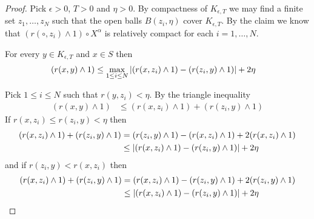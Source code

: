 \begin{proof}
Pick $\epsilon > 0$, $T > 0$ and $\eta  > 0$.  By compactness of $K_{\epsilon, T}$ we may find a finite set $z_1, \dotsc, z_N$ such that
the open balls $B(z_i, \eta)$ cover $K_{\epsilon, T}$.  By the claim we know that $(r(\circ, z_i) \wedge 1) \circ X^\alpha$ is relatively compact for each
$i = 1, \dotsc, N$.  
\begin{clm}For every $y \in K_{\epsilon, T}$ and $x \in S$ then
\begin{align*}
(r(x,y) \wedge 1) &\leq \max_{1 \leq i \leq N} \left \vert (r(x,z_i) \wedge 1) - (r(z_i,y) \wedge 1) \right \vert + 2 \eta
\end{align*}
\end{clm}
Pick $1 \leq i \leq N$ such that $r(y, z_i) < \eta$.  By the triangle inequality
\begin{align*}
(r(x,y) \wedge 1) &\leq (r(x,z_i) \wedge 1) + (r(z_i,y) \wedge 1)
\end{align*}
If $r(x,z_i) \leq r(z_i, y) < \eta$ then 
\begin{align*}
(r(x,z_i) \wedge 1) + (r(z_i,y) \wedge 1) &= (r(z_i,y) \wedge 1) - (r(x,z_i) \wedge 1)  + 2 (r(x,z_i) \wedge 1) \\
&\leq \left \vert (r(x,z_i) \wedge 1) - (r(z_i,y) \wedge 1) \right \vert + 2 \eta
\end{align*}
and if $r(z_i, y) < r(x,z_i)$ then
\begin{align*}
(r(x,z_i) \wedge 1) + (r(z_i,y) \wedge 1) &= (r(x,z_i) \wedge 1) -  (r(z_i,y) \wedge 1) + 2 (r(z_i,y) \wedge 1) \\
&\leq \left \vert (r(x,z_i) \wedge 1) - (r(z_i,y) \wedge 1) \right \vert + 2 \eta
\end{align*}


\end{proof}
